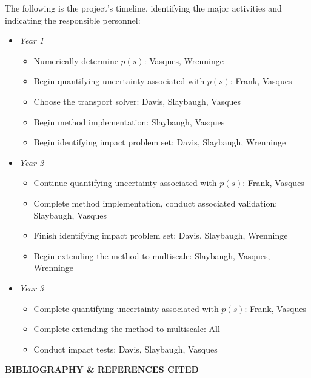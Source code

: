 \documentclass[12pt]{article}
\begin{document}
The following is the project's timeline, identifying the major activities and indicating the responsible personnel:
\begin{itemize}
\item \textit{Year 1}
\begin{itemize}[noitemsep]
\item Numerically determine $p(s)$: Vasques, Wrenninge
\item Begin quantifying uncertainty associated with $p(s)$: Frank, Vasques
\item Choose the transport solver: Davis, Slaybaugh, Vasques
\item Begin method implementation: Slaybaugh, Vasques
\item Begin identifying impact problem set: Davis, Slaybaugh, Wrenninge
\end{itemize}
\item \textit{Year 2}
\begin{itemize}[noitemsep]
\item Continue quantifying uncertainty associated with $p(s)$: Frank, Vasques
\item Complete method implementation, conduct associated validation: Slaybaugh, Vasques
\item Finish identifying impact problem set: Davis, Slaybaugh, Wrenninge
\item Begin extending the method to multiscale: Slaybaugh, Vasques, Wrenninge
\end{itemize}
\item \textit{Year 3}
\begin{itemize}[noitemsep]
\item Complete quantifying uncertainty associated with $p(s)$: Frank, Vasques
\item Complete extending the method to multiscale: All
\item Conduct impact tests: Davis, Slaybaugh, Vasques
\end{itemize}
\end{itemize}



\pagebreak


\begin{center}
{\bf BIBLIOGRAPHY \& REFERENCES CITED}
\end{center}
\end{document}
